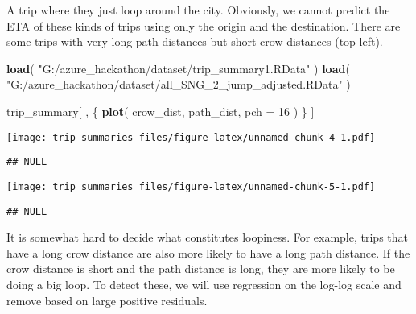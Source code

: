 \documentclass[]{article}
\newenvironment{Shaded}{\begin{snugshade}}{\end{snugshade}}
\newcommand{\DataTypeTok}[1]{\textcolor[rgb]{0.13,0.29,0.53}{#1}}
\newcommand{\DecValTok}[1]{\textcolor[rgb]{0.00,0.00,0.81}{#1}}
\newcommand{\KeywordTok}[1]{\textcolor[rgb]{0.13,0.29,0.53}{\textbf{#1}}}
\newcommand{\NormalTok}[1]{#1}
\newcommand{\OperatorTok}[1]{\textcolor[rgb]{0.81,0.36,0.00}{\textbf{#1}}}
\newcommand{\StringTok}[1]{\textcolor[rgb]{0.31,0.60,0.02}{#1}}
\begin{document}
A trip where they just loop around the city. Obviously, we cannot
predict the ETA of these kinds of trips using only the origin and the
destination. There are some trips with very long path distances but
short crow distances (top left).

\begin{Shaded}
\begin{Highlighting}[]
\KeywordTok{load}\NormalTok{( }\StringTok{"G:/azure_hackathon/dataset/trip_summary1.RData"}\NormalTok{ )}
\KeywordTok{load}\NormalTok{( }\StringTok{"G:/azure_hackathon/dataset/all_SNG_2_jump_adjusted.RData"}\NormalTok{ )}

\NormalTok{trip_summary[ , \{}
    \KeywordTok{plot}\NormalTok{( crow_dist, path_dist, }\DataTypeTok{pch =} \DecValTok{16}\NormalTok{ )}
\NormalTok{\} ]}
\end{Highlighting}
\end{Shaded}

\texttt{[image: trip\_summaries\_files/figure-latex/unnamed-chunk-4-1.pdf]}

\begin{verbatim}
## NULL
\end{verbatim}

\begin{Shaded}
\end{Shaded}

\texttt{[image: trip\_summaries\_files/figure-latex/unnamed-chunk-5-1.pdf]}

\begin{verbatim}
## NULL
\end{verbatim}

It is somewhat hard to decide what constitutes loopiness. For example,
trips that have a long crow distance are also more likely to have a long
path distance. If the crow distance is short and the path distance is
long, they are more likely to be doing a big loop. To detect these, we
will use regression on the log-log scale and remove based on large
positive residuals.
\end{document}
